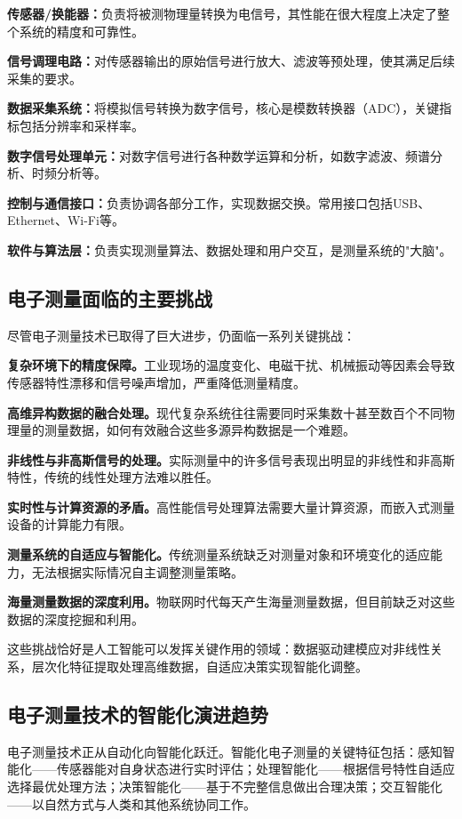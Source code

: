 \documentclass[12pt,a4paper]{article}
\numberwithin{figure}{section}
\numberwithin{table}{section}
\numberwithin{equation}{section}
\begin{document}
\textbf{传感器/换能器：}负责将被测物理量转换为电信号，其性能在很大程度上决定了整个系统的精度和可靠性。

\textbf{信号调理电路：}对传感器输出的原始信号进行放大、滤波等预处理，使其满足后续采集的要求。

\textbf{数据采集系统：}将模拟信号转换为数字信号，核心是模数转换器（ADC），关键指标包括分辨率和采样率。

\textbf{数字信号处理单元：}对数字信号进行各种数学运算和分析，如数字滤波、频谱分析、时频分析等。

\textbf{控制与通信接口：}负责协调各部分工作，实现数据交换。常用接口包括USB、Ethernet、Wi-Fi等。

\textbf{软件与算法层：}负责实现测量算法、数据处理和用户交互，是测量系统的"大脑"。

\subsection{电子测量面临的主要挑战}

尽管电子测量技术已取得了巨大进步，仍面临一系列关键挑战：

\textbf{复杂环境下的精度保障。}工业现场的温度变化、电磁干扰、机械振动等因素会导致传感器特性漂移和信号噪声增加，严重降低测量精度。

\textbf{高维异构数据的融合处理。}现代复杂系统往往需要同时采集数十甚至数百个不同物理量的测量数据，如何有效融合这些多源异构数据是一个难题。

\textbf{非线性与非高斯信号的处理。}实际测量中的许多信号表现出明显的非线性和非高斯特性，传统的线性处理方法难以胜任。

\textbf{实时性与计算资源的矛盾。}高性能信号处理算法需要大量计算资源，而嵌入式测量设备的计算能力有限。

\textbf{测量系统的自适应与智能化。}传统测量系统缺乏对测量对象和环境变化的适应能力，无法根据实际情况自主调整测量策略。

\textbf{海量测量数据的深度利用。}物联网时代每天产生海量测量数据，但目前缺乏对这些数据的深度挖掘和利用。

这些挑战恰好是人工智能可以发挥关键作用的领域：数据驱动建模应对非线性关系，层次化特征提取处理高维数据，自适应决策实现智能化调整。

\subsection{电子测量技术的智能化演进趋势}

电子测量技术正从自动化向智能化跃迁。智能化电子测量的关键特征包括：感知智能化——传感器能对自身状态进行实时评估；处理智能化——根据信号特性自适应选择最优处理方法；决策智能化——基于不完整信息做出合理决策；交互智能化——以自然方式与人类和其他系统协同工作。
\end{document}
